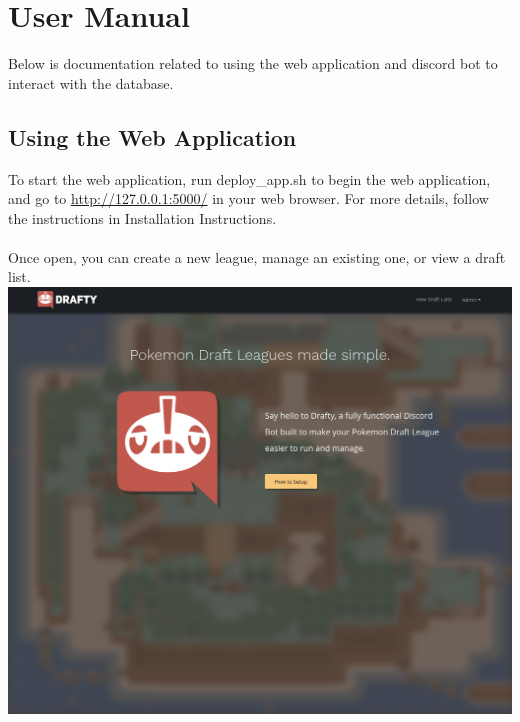 \documentclass{article}
\begin{document}
\newpage
\section*{User Manual}
Below is documentation related to using the web application and discord bot to interact with the database.
\subsection*{Using the Web Application}
  To start the web application, run deploy\_app.sh to begin the web application, and go to \url{http://127.0.0.1:5000/} in your web browser. For more details, follow the instructions in Installation Instructions.\\\\
  Once open, you can create a new league, manage an existing one, or view a draft list.\\
  \includegraphics[scale=.3]{landing.png}
\end{document}
